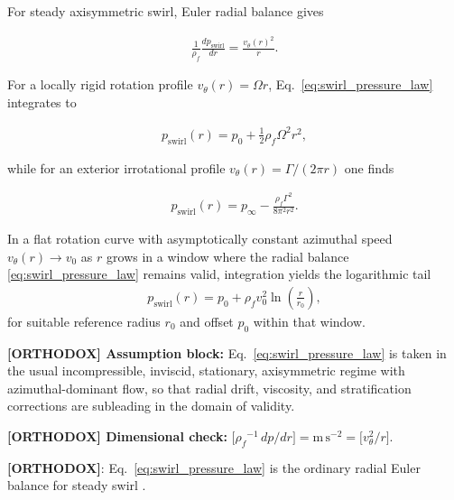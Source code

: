 \documentclass[11pt]{article}
\theoremstyle{definition}
\theoremstyle{plain}
\theoremstyle{remark}
\newcommand{\rhoF}{{\rho_{\!f}}}
\begin{document}
        For steady axisymmetric swirl, Euler radial balance gives

        \begin{align}
            \frac{1}{\rhoF}\frac{dp_{\mathrm{swirl}}}{dr} = \frac{v_\theta(r)^2}{r}.
            \label{eq:swirl_pressure_law}
        \end{align}

        For a locally rigid rotation profile $v_\theta(r)=\Omega r$, Eq.~\eqref{eq:swirl_pressure_law} integrates to

        \begin{align}
            p_{\mathrm{swirl}}(r) = p_0 + \frac{1}{2}\rhoF \Omega^2 r^2,
            \label{eq:swirl_pressure_rigid}
        \end{align}

        while for an exterior irrotational profile $v_\theta(r)=\Gamma/(2\pi r)$ one finds

        \begin{align}
            p_{\mathrm{swirl}}(r) = p_\infty - \frac{\rhoF\Gamma^2}{8\pi^2 r^2}.
            \label{eq:swirl_pressure_irrotational}
        \end{align}

        In a flat rotation curve with asymptotically constant azimuthal speed $v_\theta(r)\to v_0$ as $r$ grows in a window where the radial balance \eqref{eq:swirl_pressure_law} remains valid, integration yields the logarithmic tail
        \begin{align}
            p_{\mathrm{swirl}}(r)
            =
            p_0 + \rhoF v_0^2 \ln\!\left(\frac{r}{r_0}\right),
            \label{eq:swirl_pressure_flat_tail}
        \end{align}
        for suitable reference radius $r_0$ and offset $p_0$ within that window.

        \textbf{[ORTHODOX] Assumption block:} Eq.~\eqref{eq:swirl_pressure_law} is taken in the usual incompressible, inviscid, stationary, axisymmetric regime with azimuthal-dominant flow, so that radial drift, viscosity, and stratification corrections are subleading in the domain of validity.

        \textbf{[ORTHODOX] Dimensional check:}
        $\bigl[\rhoF^{-1}\,dp/dr\bigr]=\mathrm{m\,s^{-2}}=\bigl[v_\theta^2/r\bigr]$.

        \textbf{[ORTHODOX]}: Eq.~\eqref{eq:swirl_pressure_law} is the ordinary radial Euler balance for steady swirl \cite{Batchelor1967,Saffman1992}.
\end{document}
